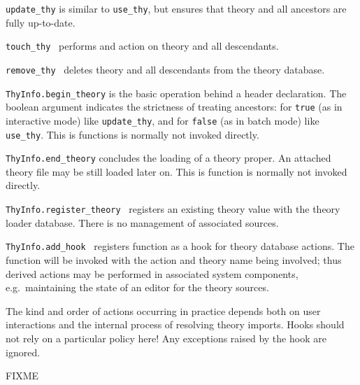 \begin{isabellebody}
\begin{isamarkuptext}
\begin{description}
  \item \verb|update_thy| is similar to \verb|use_thy|, but ensures that
  theory  and all ancestors are fully up-to-date.

  \item \verb|touch_thy|~ performs and  action
  on theory  and all descendants.

  \item \verb|remove_thy|~ deletes theory  and all
  descendants from the theory database.

  \item \verb|ThyInfo.begin_theory| is the basic operation behind a
  \isa{{\isasymTHEORY}} header declaration.  The boolean argument
  indicates the strictness of treating ancestors: for \verb|true| (as
  in interactive mode) like \verb|update_thy|, and for \verb|false| (as
  in batch mode) like \verb|use_thy|.  This is {\ML} functions is
  normally not invoked directly.

  \item \verb|ThyInfo.end_theory| concludes the loading of a theory
  proper.  An attached theory {\ML} file may be still loaded later on.
  This is function is normally not invoked directly.

  \item \verb|ThyInfo.register_theory|~ registers an
  existing theory value with the theory loader database.  There is no
  management of associated sources.

  \item \verb|ThyInfo.add_hook|~ registers function  as a hook for theory database actions.  The function will be
  invoked with the action and theory name being involved; thus derived
  actions may be performed in associated system components, e.g.\
  maintaining the state of an editor for the theory sources.

  The kind and order of actions occurring in practice depends both on
  user interactions and the internal process of resolving theory
  imports.  Hooks should not rely on a particular policy here!  Any
  exceptions raised by the hook are ignored.

  \end{description}%
\end{isamarkuptext}%
\isamarkuptrue%
%
\endisatagmlref
{\isafoldmlref}%
%
\isadelimmlref
%
\endisadelimmlref
%
\isamarkuptrue%
%
\begin{isamarkuptext}%
FIXME%
\end{isamarkuptext}%
\isamarkuptrue%
%
\isadelimtheory
%
\endisadelimtheory
%
\isatagtheory
{}\isamarkupfalse%
%
\endisatagtheory
{\isafoldtheory}%
%
\isadelimtheory
%
\endisadelimtheory
\isanewline
\end{isabellebody}%
